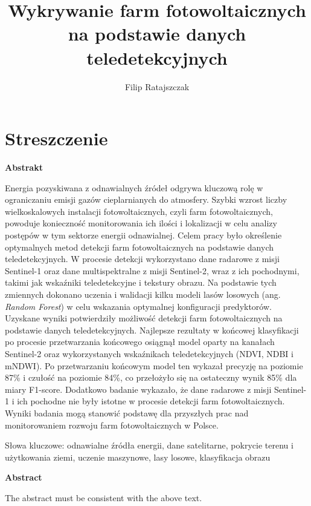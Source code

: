 \documentclass{amuthesis}
\author{Filip Ratajszczak}
\title{Wykrywanie farm fotowoltaicznych na podstawie danych
teledetekcyjnych}
\begin{document}

\titlepage


\hypertarget{streszczenie}{%
\chapter*{Streszczenie}\label{streszczenie}}


\textbf{Abstrakt}

Energia pozyskiwana z odnawialnych źródeł odgrywa kluczową rolę w
ograniczaniu emisji gazów cieplarnianych do atmosfery. Szybki wzrost
liczby wielkoskalowych instalacji fotowoltaicznych, czyli farm
fotowoltaicznych, powoduje konieczność monitorowania ich ilości i
lokalizacji w celu analizy postępów w tym sektorze energii odnawialnej.
Celem pracy było określenie optymalnych metod detekcji farm
fotowoltaicznych na podstawie danych teledetekcyjnych. W procesie
detekcji wykorzystano dane radarowe z misji Sentinel-1 oraz dane
multispektralne z misji Sentinel-2, wraz z ich pochodnymi, takimi jak
wskaźniki teledetekcyjne i tekstury obrazu. Na podstawie tych zmiennych
dokonano uczenia i walidacji kilku modeli lasów losowych (ang.
\emph{Random Forest}) w celu wskazania optymalnej konfiguracji
predyktorów. Uzyskane wyniki potwierdziły możliwość detekcji farm
fotowoltaicznych na podstawie danych teledetekcyjnych. Najlepsze
rezultaty w końcowej klasyfikacji po procesie przetwarzania końcowego
osiągnął model oparty na kanałach Sentinel-2 oraz wykorzystanych
wskaźnikach teledetekcyjnych (NDVI, NDBI i mNDWI). Po przetwarzaniu
końcowym model ten wykazał precyzję na poziomie 87\% i czułość na
poziomie 84\%, co przełożyło się na ostateczny wynik 85\% dla miary
F1-score. Dodatkowo badanie wykazało, że dane radarowe z misji
Sentinel-1 i ich pochodne nie były istotne w procesie detekcji farm
fotowoltaicznych. Wyniki badania mogą stanowić podstawę dla przyszłych
prac nad monitorowaniem rozwoju farm fotowoltaicznych w Polsce.

Słowa kluczowe: odnawialne źródła energii, dane satelitarne, pokrycie
terenu i użytkowania ziemi, uczenie maszynowe, lasy losowe, klasyfikacja
obrazu

\newpage

\textbf{Abstract}

The abstract must be consistent with the above text.
\end{document}
